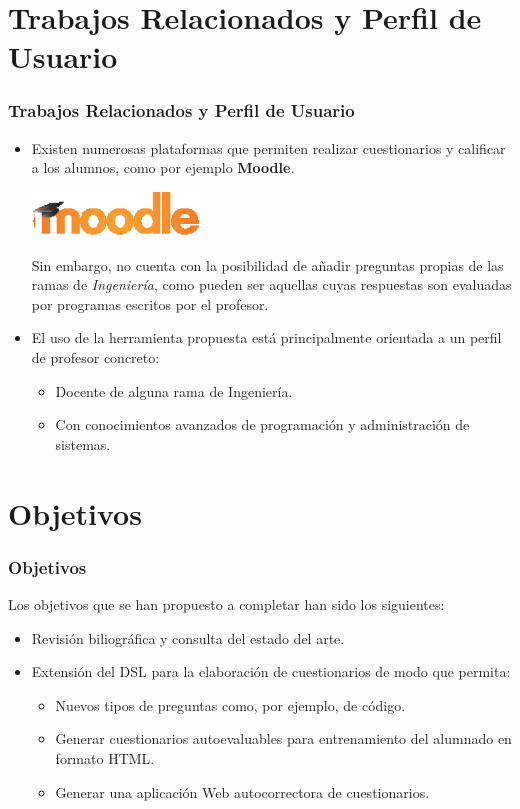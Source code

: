 \documentclass{beamer}
\begin{document}
\section{Trabajos Relacionados y Perfil de Usuario}
\begin{frame}
  \frametitle{Trabajos Relacionados y Perfil de Usuario}
  \begin{itemize}
    \item Existen numerosas plataformas que permiten realizar cuestionarios y calificar a los alumnos, como por ejemplo {\bfseries Moodle}.
    \begin{center}
      \includegraphics[width=0.35\textwidth]{img/moodle.eps}
    \end{center}
    Sin embargo, no cuenta con la posibilidad de añadir preguntas propias de las ramas de \textit{Ingeniería}, como pueden ser aquellas
    cuyas respuestas son evaluadas por programas escritos por el profesor.
    \framebreak
    
    \item El uso de la herramienta propuesta está principalmente orientada a un perfil de profesor concreto:
    \begin{itemize}
      \item Docente de alguna rama de Ingeniería.
      \item Con conocimientos avanzados de programación y administración de sistemas.
    \end{itemize}
  \end{itemize}
  
\end{frame}

\section{Objetivos}
\begin{frame}
  \frametitle{Objetivos}
  
  Los objetivos que se han propuesto a completar han sido los siguientes:
  \begin{itemize}
    \item Revisión biliográfica y consulta del estado del arte.
    \item Extensión del DSL para la elaboración de cuestionarios de modo que permita:
    \begin{itemize}
      \item Nuevos tipos de preguntas como, por ejemplo, de código.
      \item Generar cuestionarios autoevaluables para entrenamiento del alumnado en formato HTML.
      \item Generar una aplicación Web autocorrectora de cuestionarios.
    \end{itemize}
  \end{itemize}
\end{frame}
\end{document}
